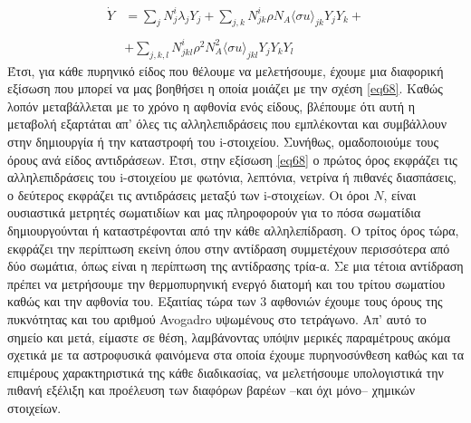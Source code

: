 \begin{align}
\label{eq68}
\nonumber \dot{Y} &= \sum_{j} N^{i}_{j} \lambda_{j} Y_{j}+ \sum_{j,k} N^{i}_{jk}\rho N_{A} \langle\sigma u \rangle _{jk}Y_{j}Y_{k} + \\ \nonumber \\
&+ \sum_{j,k,l} N^{i}_{jkl}\rho ^{2} N_{A} ^{2} \langle\sigma u \rangle _{jkl}Y_{j}Y_{k}Y_{l}
\end{align}
Έτσι, για κάθε πυρηνικό είδος που θέλουμε να μελετήσουμε, έχουμε μια διαφορική εξίσωση που μπορεί να μας βοηθήσει η οποία μοιάζει με την σχέση \eqref{eq68}. Καθώς λοπόν μεταβάλλεται με το χρόνο η αφθονία ενός είδους, βλέπουμε ότι αυτή η μεταβολή εξαρτάται απ' όλες τις αλληλεπιδράσεις που εμπλέκονται και συμβάλλουν στην δημιουργία ή την καταστροφή του i-στοιχείου. Συνήθως, ομαδοποιούμε τους όρους ανά είδος αντιδράσεων. Έτσι, στην εξίσωση \eqref{eq68} ο πρώτος όρος εκφράζει τις αλληλεπιδράσεις του i-στοιχείου με φωτόνια, λεπτόνια, νετρίνα ή πιθανές διασπάσεις, ο δεύτερος εκφράζει τις αντιδράσεις μεταξύ των i-στοιχείων. Οι όροι $N$, είναι ουσιαστικά μετρητές σωματιδίων και μας πληροφορούν για το πόσα σωματίδια δημιουργούνται ή καταστρέφονται από την κάθε αλληλεπίδραση. Ο τρίτος όρος τώρα, εκφράζει την περίπτωση εκείνη όπου στην αντίδραση συμμετέχουν περισσότερα από δύο σωμάτια, όπως είναι η περίπτωση της αντίδρασης τρία-α. Σε μια τέτοια αντίδραση πρέπει να μετρήσουμε την θερμοπυρηνική ενεργό διατομή και του τρίτου σωματίου καθώς και την αφθονία του. Εξαιτίας τώρα των 3 αφθονιών έχουμε τους όρους της πυκνότητας και του αριθμού Avogadro υψωμένους στο τετράγωνο. 
Απ' αυτό το σημείο και μετά, είμαστε σε θέση, λαμβάνοντας υπόψιν μερικές παραμέτρους ακόμα σχετικά με τα αστροφυσικά φαινόμενα στα οποία έχουμε πυρηνοσύνθεση καθώς και τα επιμέρους χαρακτηριστικά της κάθε διαδικασίας, να μελετήσουμε υπολογιστικά την πιθανή εξέλιξη και προέλευση των διαφόρων βαρέων --και όχι μόνο-- χημικών στοιχείων.

